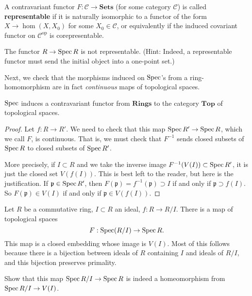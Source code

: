 \begin{exercise} 
A contravariant functor $F: \mathcal{C} \to \mathbf{Sets}$ (for
some category
$\mathcal{C}$) is called \textbf{representable} if it is
naturally isomorphic
to a functor of the form $X \to \hom(X, X_0)$ for some $X_0 \in
\mathcal{C}$,
or equivalently if the induced covariant functor on
$\mathcal{C}^{\mathrm{op}}$ is corepresentable. 

The functor $R \to \operatorname{Spec} R $ is not representable. (Hint:
Indeed, a representable
functor must send the initial object into a one-point set.)
\end{exercise} 

Next, we check that the morphisms induced on $\operatorname{Spec}$'s from a
ring-homomorphism are in fact \emph{continuous} maps of
topological spaces.

\begin{proposition} 
$\operatorname{Spec} $ induces a contravariant functor from $\mathbf{Rings}$
to the category
$\mathbf{Top}$ of topological spaces.
\end{proposition} 
\begin{proof} Let $f : R \to R'$. 
We need to check that this map $ \operatorname{Spec} R' \to \operatorname{Spec} R$, which we
call $F$, is
continuous.
That is, we must check that $F^{-1}$ sends closed
subsets of $\operatorname{Spec} R$ to closed subsets of $\operatorname{Spec} R'$.  

More precisely, if $I \subset
R$ and we take the inverse image $F^{-1}(V(I)) \subset \operatorname{Spec}
R'$, it is just
the closed set $V(f(I))$. This is best left to the reader, but
here is the justification. If $\mathfrak{p} \in \operatorname{Spec} R'$, then
$F(\mathfrak{p}) = f^{-1}(\mathfrak{p})
\supset I$ if and only if $\mathfrak{p} \supset f(I)$. So
$F(\mathfrak{p}) \in
V(I)$ if and only if $\mathfrak{p} \in V(f(I))$.

\end{proof} 



\begin{example} 
Let $R$ be a commutative ring, $I \subset R$ an ideal, $f: R \to
R/I$. There is a map
of topological spaces
\[ F: \operatorname{Spec} (R/I) \to \operatorname{Spec} R  .\]
This map is a closed embedding whose image is $V(I)$. Most of
this follows because
there is a bijection between ideals of $R$ containing $I$ and
ideals of $R/I$, and this bijection preserves primality.

\begin{exercise} 
Show that this map $\operatorname{Spec} R/I \to \operatorname{Spec} R$ is indeed a
homeomorphism from $\operatorname{Spec} R/I
\to V(I)$.  
\end{exercise} 
\end{example} 

